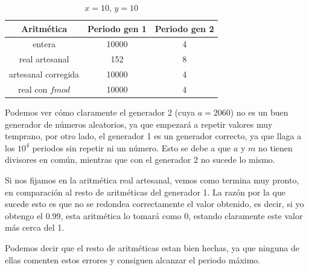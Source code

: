 \documentclass[11pt,a4paper]{report}
\begin{document}
\begin{table}[H]
	\centering
	\begin{tabular}{c|c|c}
	\textbf{Aritmética}	& \textbf{Periodo gen 1} & \textbf{Periodo gen 2} \\ \hline
	entera   			& 10000         		 & 4 					  \\ \hline
	real artesanal		& 152         			 & 8					  \\ \hline
	artesanal corregida & 10000        			 & 4				  	  \\ \hline
	real con $fmod$ 	& 10000        			 & 4				  	  \\
	\end{tabular}
	\caption{$x=10$, $y=10$}
\end{table}

Podemos ver cómo claramente el generador 2 (cuya $a=2060$) no es un buen generador de números aleatorios, ya que empezará a repetir valores muy temprano, por
otro lado, el generador 1 es un generador correcto, ya que llaga a los $10^4$ periodos sin repetir ni un número. Esto se debe a que $a$ y $m$ no tienen
divisores en común, mientras que con el generador 2 no sucede lo mismo.

Si nos fijamos en la aritmética real artesanal, vemos como termina muy pronto, en comparación al resto de aritméticas del generador 1. La razón por la que
sucede esto es que no se redondea correctamente el valor obtenido, es decir, si yo obtengo el 0.99, esta aritmética lo tomará como 0, estando claramente este
valor más cerca del 1.

Podemos decir que el resto de aritméticas estan bien hechas, ya que ninguna de ellas comenten estos errores y consiguen alcanzar el periodo máximo.
\end{document}
